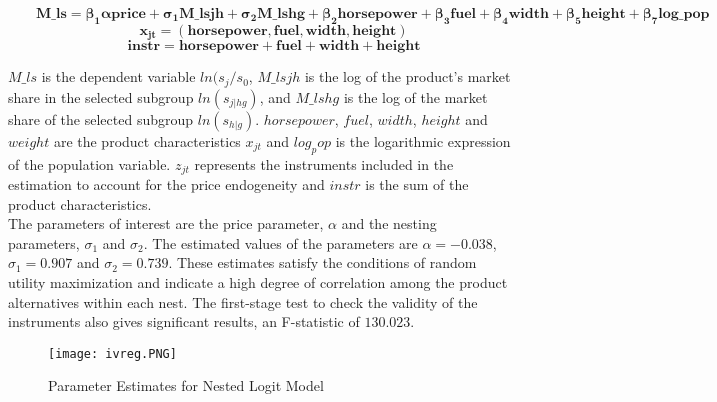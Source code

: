 \documentclass[a4paper,11pt]{article}
\begin{document}
    \begin{equation*}
        \qquad \mathbf{M\_ls = \beta_{1} \alpha price + \sigma_{1} M\_lsjh + \sigma_{2} M\_lshg + \beta_{2} horsepower + \beta_{3} fuel + \beta_{4} width + \beta_{5} height + \beta_{7} log\_pop}
    \end{equation*}
    \begin{equation*}
        \qquad \mathbf{x_{jt} = (horsepower, fuel, width, height)}
    \end{equation*}
    \begin{equation*}
        \qquad \mathbf{instr = horsepower+ fuel + width + height }
    \end{equation*}

    $M\_ls$ is the dependent variable $ln(s_{j}/s_{0}$, $M\_lsjh$ is the log of the product's market share in the selected subgroup $ln(s_{j|hg})$, and $M\_lshg$ is the log of the market share of the selected subgroup $ln(s_{h|g})$. $horsepower$, $fuel$, $width$, $height$ and $weight$ are the product characteristics $x_{jt}$ and $log_pop$ is the logarithmic expression of the population variable. $z_{jt}$ represents the instruments included in the estimation to account for the price endogeneity and $instr$ is the sum of the product characteristics.\\

    \newpage
    The parameters of interest are the price parameter, $\alpha$ and the nesting parameters, $\sigma_{1}$ and $\sigma_{2}$. The estimated values of the parameters are $\alpha = -0.038$, $\sigma_{1} = 0.907$ and $\sigma_{2} = 0.739$. These estimates satisfy the conditions of random utility maximization and indicate a high degree of correlation among the product alternatives within each nest. The first-stage test to check the validity of the instruments also gives significant results, an F-statistic of $130.023$.\\
    
    \begin{figure}[htb]
        \centering
        \texttt{[image: ivreg.PNG]}
        \caption{Parameter Estimates for Nested Logit Model}
        \label{fig:Estimates}
    \end{figure}
\end{document}
